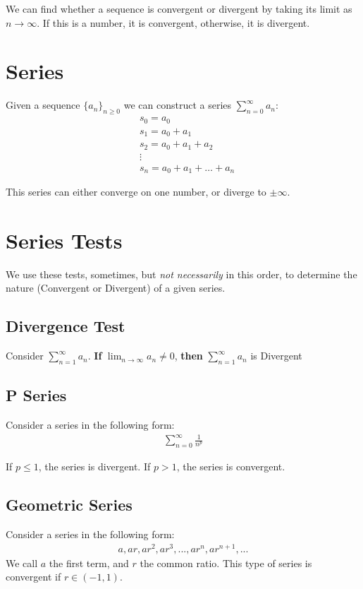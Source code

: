 \documentclass[12pt,letterpaper]{article} \usepackage{amsmath} \usepackage{graphicx}  \usepackage{longtable}  \usepackage{amssymb}
\begin{document}
    We can find whether a sequence is convergent or divergent by taking its limit as $n\to\infty$. If this is a number, it is convergent, otherwise, it is divergent.

    \section{Series}
    Given a sequence $\{a_n\}_{n \ge 0}$ we can construct a series $\sum _{n=0} ^{\infty} a_n$:
    \begin{align*}
        &s_0 = a_0\\
        &s_1 = a_0 + a_1 \\
        &s_2 = a_0 + a_1 + a_2\\
        &\vdots\\
        &s_n = a_0 + a_1 + \dots + a_n
    \end{align*}

    This series can either converge on one number, or diverge to $\pm \infty$.

    \section{Series Tests}
    We use these tests, sometimes, but \emph{not necessarily} in this order, to determine the nature (Convergent or Divergent) of a given series. 

        \subsection{Divergence Test}
        Consider $\sum ^{\infty} _ {n=1} a_n$.
        \textbf{If} $\lim_{n\to\infty} a_n \ne 0$, \textbf{then} $\sum ^{\infty} _ {n=1} a_n$ is Divergent

        \subsection{P Series}
        Consider a series in the following form:
        \begin{align*}
            \sum^\infty _{n=0} \frac{1}{n^p}
        \end{align*}

        If $p\le 1$, the series is divergent. If $p>1$, the series is convergent.

        \subsection{Geometric Series}
        Consider a series in the following form:
        \begin{align*}
            a, ar, ar^2, ar^3, ..., ar^n, ar^{n+1}, ...
        \end{align*}
        We call $a$ the first term, and $r$ the common ratio.
        This type of series is convergent if $r\in(-1,1)$.
\end{document}
